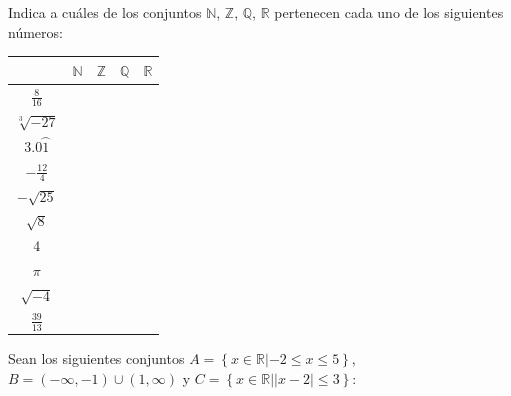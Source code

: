\documentclass[addpoints,spanish, 12pt,a4paper]{exam}
\renewcommand*\half{.5}
\begin{document}
\begin{questions}





\question[1] Indica a cuáles de los conjuntos
$\mathbb{N}$, $\mathbb{Z}$, $\mathbb{Q}$, $\mathbb{R}$ pertenecen cada uno de los siguientes números:
\begin{center}
\begin{tabular}{|c |c |c |c |c|}\hline
&$\mathbb{N}$& $\mathbb{Z}$& $\mathbb{Q}$&$\mathbb{R}$\\ 
\hline
$\frac{8}{16}$&&&&\\
\hline
$\sqrt[3]{-27}$&&&&\\
\hline
$3.0\wideparen{1}$&&&&\\
\hline
$-\frac{12}{4}$&&&&\\
\hline
$-\sqrt{25}$&&&&\\
\hline
$\sqrt{8}$&&&&\\
\hline
$4$&&&&\\
\hline
$\pi$&&&&\\
\hline
$\sqrt{-4}$&&&&\\
\hline
$\frac{39}{13}$&&&&\\
\hline
\end{tabular}

\end{center}

        \question Sean los siguientes conjuntos $ A=\left\{ x \in \mathbb{R}| -2 \leq x  \leq 5 \right\}$, $  B=\left(-\infty, -1\right) \cup \left(1, \infty\right)$  y  $C=\left\{ x \in \mathbb{R}| \left|{x - 2}\right|\leq3 \right\}$:  


\end{questions}
\end{document}
